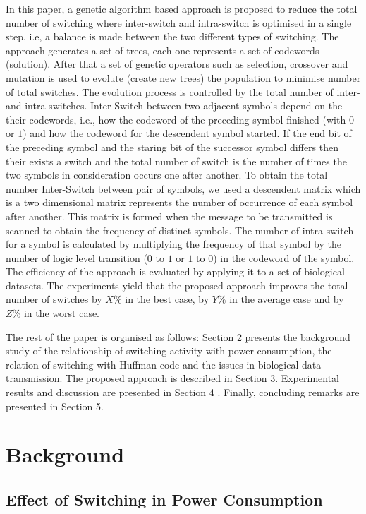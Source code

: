 \documentclass[preprint,12pt]{elsarticle}
\begin{document}
In this paper, a genetic algorithm based approach is proposed to reduce the total number of switching where inter-switch and intra-switch is optimised in a single step, i.e, a balance is made between the two different types of switching. The approach generates a set of trees, each one represents a set of codewords (solution). After that a set of genetic operators such as selection, crossover and mutation is used to evolute (create new trees) the population to minimise number of total switches. The evolution process is controlled by the total number of inter- and intra-switches.  Inter-Switch between two adjacent symbols depend on the their codewords, i.e., how the codeword of the preceding symbol finished (with $0$ or $1$) and how the codeword for the descendent symbol started. If the end bit of the preceding symbol and the staring bit of the successor symbol differs then their exists a switch and the total number of switch is the number of times the two symbols in consideration occurs one after another. To obtain the total number Inter-Switch between pair of symbols, we used a descendent matrix which is a two dimensional matrix represents the number of occurrence of each symbol after another. This matrix is formed when the message to be transmitted is scanned to obtain the frequency of distinct symbols. The number of intra-switch for a symbol is calculated by multiplying the frequency of that symbol by the number of logic level transition ($0$ to $1$ or $1$ to $0$) in the codeword of the symbol. The efficiency of the approach is evaluated by applying it to a set of biological datasets. The experiments yield that the proposed approach improves the total number of switches by $X\%$ in the best case, by $Y\%$ in the average case and by $Z\%$
in the worst case.

The rest of the paper is organised as follows:
Section 2 presents the background study of the
relationship of switching activity with power consumption, the relation of switching with Huffman code and the issues in biological data transmission. The proposed approach is described in Section 3. Experimental results and
discussion are presented in Section 4 . Finally,
concluding remarks are presented in Section 5. 
\section{Background}
\subsection{Effect of Switching in Power Consumption}
\end{document}
